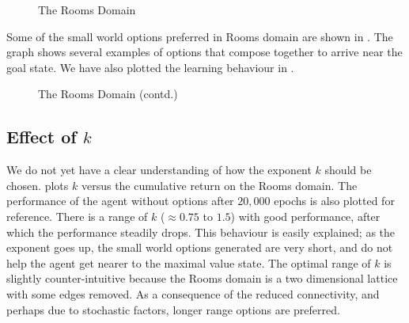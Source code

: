 \begin{figure}[th]
    \center
    \caption{The Rooms Domain}
\end{figure}

Some of the small world options preferred in Rooms domain are shown in
. The graph shows several examples of options
that compose together to arrive near the goal state. We have also
plotted the learning behaviour in . 

\begin{figure}[th]
    \center
    \caption{The Rooms Domain (contd.)}
\end{figure}

\subsection{Effect of $k$}
We do not yet have a clear understanding of how the exponent $k$ should
be chosen.  plots $k$ versus the cumulative return
on the Rooms domain. The performance of the agent without options after
$20,000$ epochs is also plotted for reference. There is a range of $k$
($\approx 0.75$ to $1.5$) with good performance, after which the
performance steadily drops. This behaviour is easily explained; as the
exponent goes up, the small world options generated are very short, and
do not help the agent get nearer to the maximal value state. The optimal
range of $k$ is slightly counter-intuitive because the Rooms domain is
a two dimensional lattice with some edges removed. As a consequence of
the reduced connectivity, and perhaps due to stochastic factors, longer
range options are preferred.

